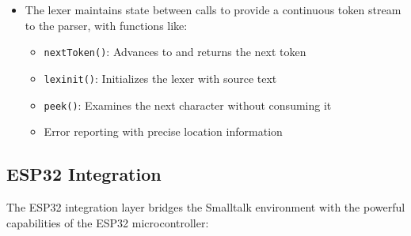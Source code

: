 \documentclass[12pt,a4paper]{report}
\begin{document}
\begin{itemize}
    \item The lexer maintains state between calls to provide a continuous token stream to the parser, with functions like:
    \begin{itemize}
        \item \texttt{nextToken()}: Advances to and returns the next token
        \item \texttt{lexinit()}: Initializes the lexer with source text
        \item \texttt{peek()}: Examines the next character without consuming it
        \item Error reporting with precise location information
    \end{itemize}
\end{itemize}

\subsection{ESP32 Integration}
The ESP32 integration layer bridges the Smalltalk environment with the powerful capabilities of the ESP32 microcontroller:
\end{document}
